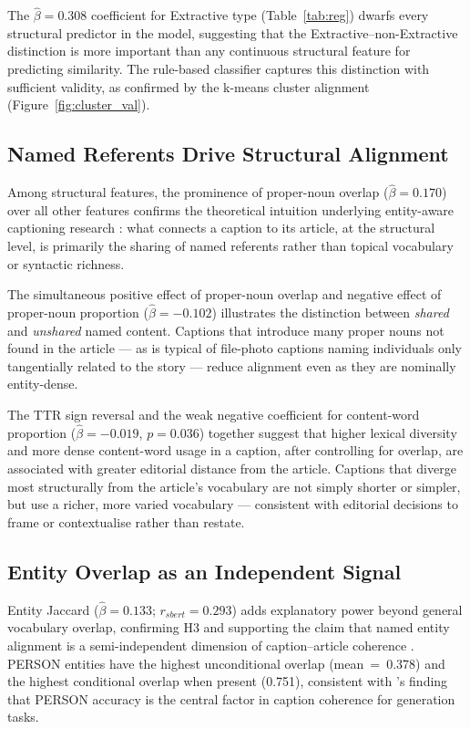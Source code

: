 \documentclass[11pt,a4paper]{article}
\begin{document}
The $\hat{\beta} = 0.308$ coefficient for Extractive type (Table~\ref{tab:reg})
dwarfs every structural predictor in the model, suggesting that the
Extractive--non-Extractive distinction is more important than any
continuous structural feature for predicting similarity. The rule-based
classifier captures this distinction with sufficient validity, as confirmed
by the k-means cluster alignment (Figure~\ref{fig:cluster_val}).

\subsection{Named Referents Drive Structural Alignment}

Among structural features, the prominence of proper-noun overlap
($\hat{\beta} = 0.170$) over all other features confirms the theoretical
intuition underlying entity-aware captioning research
\citep{biten2019goodnews, Tranetal2020, Qu2024VACNIC}: what connects a
caption to its article, at the structural level, is primarily the sharing
of named referents rather than topical vocabulary or syntactic richness.

The simultaneous positive effect of proper-noun overlap and negative
effect of proper-noun proportion ($\hat{\beta} = -0.102$) illustrates
the distinction between \textit{shared} and \textit{unshared} named
content. Captions that introduce many proper nouns not found in the
article --- as is typical of file-photo captions naming individuals only
tangentially related to the story --- reduce alignment even as they are
nominally entity-dense.

The TTR sign reversal and the weak negative coefficient for
content-word proportion ($\hat{\beta} = -0.019$, $p = 0.036$) together
suggest that higher lexical diversity and more dense content-word usage
in a caption, after controlling for overlap, are associated with greater
editorial distance from the article. Captions that diverge most
structurally from the article's vocabulary are not simply shorter or
simpler, but use a richer, more varied vocabulary --- consistent with
editorial decisions to frame or contextualise rather than restate.

\subsection{Entity Overlap as an Independent Signal}

Entity Jaccard ($\hat{\beta} = 0.133$; $r_{sbert} = 0.293$) adds
explanatory power beyond general vocabulary overlap, confirming H3 and
supporting the claim that named entity alignment is a semi-independent
dimension of caption--article coherence \citep{mullerbanek2021multimodal}.
PERSON entities have the highest unconditional overlap (mean~=~0.378)
and the highest conditional overlap when present (0.751), consistent
with \citet{Tranetal2020}'s finding that PERSON accuracy is the central
factor in caption coherence for generation tasks.
\end{document}
